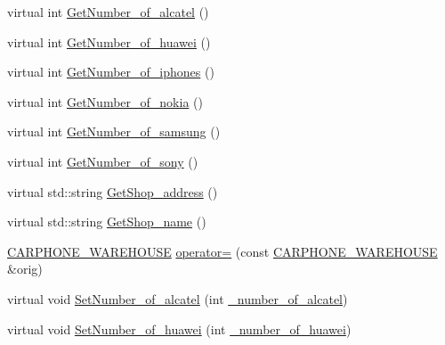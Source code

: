 \begin{DoxyCompactItemize}
virtual int \hyperlink{class_c_a_r_p_h_o_n_e___w_a_r_e_h_o_u_s_e_a8d278005b2ba46869f6787681ad05704_a8d278005b2ba46869f6787681ad05704}{Get\+Number\+\_\+of\+\_\+alcatel} ()
\item 
virtual int \hyperlink{class_c_a_r_p_h_o_n_e___w_a_r_e_h_o_u_s_e_a9200c484f288fce0246008e5d683507f_a9200c484f288fce0246008e5d683507f}{Get\+Number\+\_\+of\+\_\+huawei} ()
\item 
virtual int \hyperlink{class_c_a_r_p_h_o_n_e___w_a_r_e_h_o_u_s_e_a640af469d055cb8836c42ac4ce135e6f_a640af469d055cb8836c42ac4ce135e6f}{Get\+Number\+\_\+of\+\_\+iphones} ()
\item 
virtual int \hyperlink{class_c_a_r_p_h_o_n_e___w_a_r_e_h_o_u_s_e_aac1959dee51204439fc0721403d23447_aac1959dee51204439fc0721403d23447}{Get\+Number\+\_\+of\+\_\+nokia} ()
\item 
virtual int \hyperlink{class_c_a_r_p_h_o_n_e___w_a_r_e_h_o_u_s_e_a0cd9d93b5b145846627d3005dff71f6f_a0cd9d93b5b145846627d3005dff71f6f}{Get\+Number\+\_\+of\+\_\+samsung} ()
\item 
virtual int \hyperlink{class_c_a_r_p_h_o_n_e___w_a_r_e_h_o_u_s_e_a955e5b413e1f41a36dcc12837664f364_a955e5b413e1f41a36dcc12837664f364}{Get\+Number\+\_\+of\+\_\+sony} ()
\item 
virtual std\+::string \hyperlink{class_c_a_r_p_h_o_n_e___w_a_r_e_h_o_u_s_e_a90c80d52aa860d00c3fb9c165646637b_a90c80d52aa860d00c3fb9c165646637b}{Get\+Shop\+\_\+address} ()
\item 
virtual std\+::string \hyperlink{class_c_a_r_p_h_o_n_e___w_a_r_e_h_o_u_s_e_a4932d1483f97e12e01be200951c572df_a4932d1483f97e12e01be200951c572df}{Get\+Shop\+\_\+name} ()
\item 
\hyperlink{class_c_a_r_p_h_o_n_e___w_a_r_e_h_o_u_s_e}{C\+A\+R\+P\+H\+O\+N\+E\+\_\+\+W\+A\+R\+E\+H\+O\+U\+SE} \hyperlink{class_c_a_r_p_h_o_n_e___w_a_r_e_h_o_u_s_e_a8d5661ef7c79d7527967c61654ebb612_a8d5661ef7c79d7527967c61654ebb612}{operator=} (const \hyperlink{class_c_a_r_p_h_o_n_e___w_a_r_e_h_o_u_s_e}{C\+A\+R\+P\+H\+O\+N\+E\+\_\+\+W\+A\+R\+E\+H\+O\+U\+SE} \&orig)
\item 
virtual void \hyperlink{class_c_a_r_p_h_o_n_e___w_a_r_e_h_o_u_s_e_a84d8d820016c7eb50323c2dcbb4d73f3_a84d8d820016c7eb50323c2dcbb4d73f3}{Set\+Number\+\_\+of\+\_\+alcatel} (int \hyperlink{class_c_a_r_p_h_o_n_e___w_a_r_e_h_o_u_s_e_a7e089af48a2a409a8d348d81f65d9193_a7e089af48a2a409a8d348d81f65d9193}{\+\_\+number\+\_\+of\+\_\+alcatel})
\item 
virtual void \hyperlink{class_c_a_r_p_h_o_n_e___w_a_r_e_h_o_u_s_e_a87ba00e49e5b201548c57ef4b8beaeff_a87ba00e49e5b201548c57ef4b8beaeff}{Set\+Number\+\_\+of\+\_\+huawei} (int \hyperlink{class_c_a_r_p_h_o_n_e___w_a_r_e_h_o_u_s_e_a4bf36b969e0873142ecac780d6f240bf_a4bf36b969e0873142ecac780d6f240bf}{\+\_\+number\+\_\+of\+\_\+huawei})

\end{DoxyCompactItemize}
